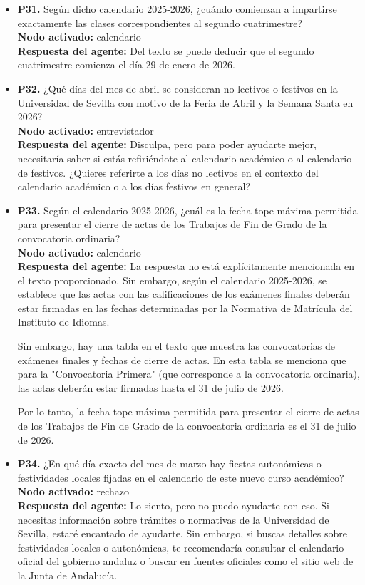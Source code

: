 \documentclass{article}
\begin{document}
\begin{itemize}
      \item \textbf{P31.} Según dicho calendario 2025-2026, ¿cuándo comienzan a impartirse exactamente las clases correspondientes al segundo cuatrimestre? \\
            \textbf{Nodo activado:} calendario \\
            \textbf{Respuesta del agente:} Del texto se puede deducir que el segundo cuatrimestre comienza el día 29 de enero de 2026.

      \item \textbf{P32.} ¿Qué días del mes de abril se consideran no lectivos o festivos en la Universidad de Sevilla con motivo de la Feria de Abril y la Semana Santa en 2026? \\
            \textbf{Nodo activado:} entrevistador \\
            \textbf{Respuesta del agente:} Disculpa, pero para poder ayudarte mejor, necesitaría saber si estás refiriéndote al calendario académico o al calendario de festivos. ¿Quieres referirte a los días no lectivos en el contexto del calendario académico o a los días festivos en general?

      \item \textbf{P33.} Según el calendario 2025-2026, ¿cuál es la fecha tope máxima permitida para presentar el cierre de actas de los Trabajos de Fin de Grado de la convocatoria ordinaria? \\
            \textbf{Nodo activado:} calendario \\
            \textbf{Respuesta del agente:} La respuesta no está explícitamente mencionada en el texto proporcionado. Sin embargo, según el calendario 2025-2026, se establece que las actas con las calificaciones de los exámenes finales deberán estar firmadas en las fechas determinadas por la Normativa de Matrícula del Instituto de Idiomas.

            Sin embargo, hay una tabla en el texto que muestra las convocatorias de exámenes finales y fechas de cierre de actas. En esta tabla se menciona que para la "Convocatoria Primera" (que corresponde a la convocatoria ordinaria), las actas deberán estar firmadas hasta el 31 de julio de 2026.

            Por lo tanto, la fecha tope máxima permitida para presentar el cierre de actas de los Trabajos de Fin de Grado de la convocatoria ordinaria es el 31 de julio de 2026.

      \item \textbf{P34.} ¿En qué día exacto del mes de marzo hay fiestas autonómicas o festividades locales fijadas en el calendario de este nuevo curso académico? \\
            \textbf{Nodo activado:} rechazo \\
            \textbf{Respuesta del agente:} Lo siento, pero no puedo ayudarte con eso. Si necesitas información sobre trámites o normativas de la Universidad de Sevilla, estaré encantado de ayudarte. Sin embargo, si buscas detalles sobre festividades locales o autonómicas, te recomendaría consultar el calendario oficial del gobierno andaluz o buscar en fuentes oficiales como el sitio web de la Junta de Andalucía.


\end{itemize}
\end{document}
